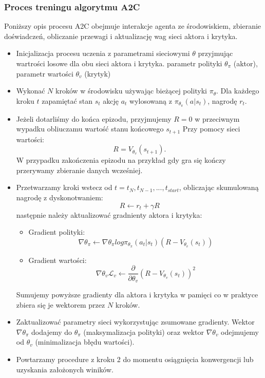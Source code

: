\documentclass[a4paper, 10pt]{article}
\begin{document}
    \subsubsection{Proces treningu algorytmu A2C}
    Poniższy opis procesu A2C obejmuje interakcje agenta ze środowiskiem, zbieranie doświadczeń, obliczanie przewagi i aktualizację wag sieci aktora i krytyka.
    \begin{itemize}
        \item Inicjalizacja procesu uczenia z parametrami sieciowymi \( \theta \) przyjmując wartrości losowe dla obu sieci aktora i krytyka.
        parametr polityki \( \theta_\pi \) (aktor), parametr wartości \( \theta_v \) (krytyk)
        \item Wykonać \( N \) kroków w środowisku używając bieżącej polityki \( \pi_\theta \). Dla każdego kroku
        \( t \) zapamiętać stan \( s_t \) akcję \( a_t \) wylosowaną z \( \pi_{\theta_\pi} (a|s_t) \), nagrodę \( r_t \).
        \item Jeżeli dotarliśmy do końca epizodu, przyjmujemy \( R = 0 \) w przeciwnym wypadku obliuczamu wartość stanu końcowego \( s_{t+1} \)
        Przy pomocy sieci wartości:
        \[ R = V_{\theta_v}(s_{t+1}). \]
        W przypadku zakończenia epizodu na przykład gdy gra się kończy przerywamy zbieranie danych wcześniej.
        \item Przetwarzamy kroki wstecz od \( t = t_N, t_{N-1}, ..., t_{start} \), obliczając skumulowaną nagrodę z dyskonotwaniem:
        \[ R \leftarrow r_t + \gamma R \]
        następnie należy aktualizować gradnienty aktora i krytyka:
        \begin{itemize}
            \item Gradient polityki:
            \[ \nabla \theta_\pi \leftarrow \nabla \theta_\pi log \pi_{\theta_\pi} (a_t|s_t) (R-V_{\theta_v}(s_t)) \]
            \item Gradient wartości:
            \[ \nabla \theta_v \mathcal{L}_v \leftarrow \frac{\partial}{\partial \theta_v} (R - V_{\theta_v}(s_t))^2 \]
        \end{itemize}
        Sumujemy powyższe gradienty dla aktora i krytyka w pamięci co w praktyce zbiera się je wektorem przez \( N \) kroków.
        \item Zaktualizować parametry sieci wykorzystując zsumowane gradienty. Wektor \( \nabla \theta_\pi \) dodajemy do \( \theta_\pi \) (maksymalizacja polityki) oraz
        wektor \( \nabla \theta_v \) odejmujemy od \( \theta_v \) (minimalizacja błędu wartości).
        \item Powtarzamy procedure z kroku 2 do momentu osiągnięcia konwergencji lub uzyskania założonych winików.
    \end{itemize}
\end{document}
